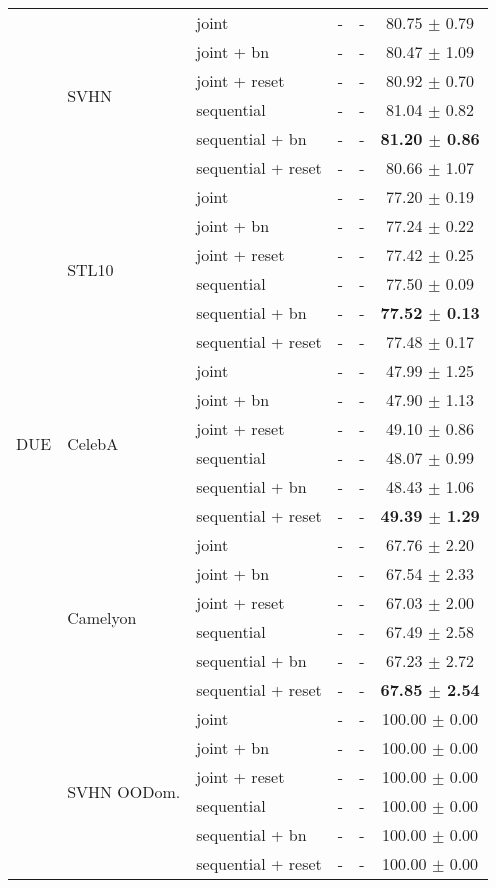 \begin{table}[!htb]
\begin{tabular}{lllccc}
\multirow{30}{*}{DUE} &\multirow{6}{*}{SVHN} &joint &- &- &80.75 $\pm$ 0.79 \\
& &joint + bn &- &- &80.47 $\pm$ 1.09 \\
& &joint + reset &- &- &80.92 $\pm$ 0.70 \\
& &sequential &- &- &81.04 $\pm$ 0.82 \\
& &sequential + bn &- &- &\textbf{81.20 $\pm$ 0.86} \\
& &sequential + reset &- &- &80.66 $\pm$ 1.07 \\
\cmidrule[0.1pt](lr){2-6}
&\multirow{6}{*}{STL10} &joint &- &- &77.20 $\pm$ 0.19 \\
& &joint + bn &- &- &77.24 $\pm$ 0.22 \\
& &joint + reset &- &- &77.42 $\pm$ 0.25 \\
& &sequential &- &- &77.50 $\pm$ 0.09 \\
& &sequential + bn &- &- &\textbf{77.52 $\pm$ 0.13} \\
& &sequential + reset &- &- &77.48 $\pm$ 0.17 \\
\cmidrule[0.1pt](lr){2-6}
&\multirow{6}{*}{CelebA} &joint &- &- &47.99 $\pm$ 1.25 \\
& &joint + bn &- &- &47.90 $\pm$ 1.13 \\
& &joint + reset &- &- &49.10 $\pm$ 0.86 \\
& &sequential &- &- &48.07 $\pm$ 0.99 \\
& &sequential + bn &- &- &48.43 $\pm$ 1.06 \\
& &sequential + reset &- &- &\textbf{49.39 $\pm$ 1.29} \\
\cmidrule[0.1pt](lr){2-6}
&\multirow{6}{*}{Camelyon} &joint &- &- &67.76 $\pm$ 2.20 \\
& &joint + bn &- &- &67.54 $\pm$ 2.33 \\
& &joint + reset &- &- &67.03 $\pm$ 2.00 \\
& &sequential &- &- &67.49 $\pm$ 2.58 \\
& &sequential + bn &- &- &67.23 $\pm$ 2.72 \\
& &sequential + reset &- &- &\textbf{67.85 $\pm$ 2.54} \\
\cmidrule[0.1pt](lr){2-6}
&\multirow{6}{*}{SVHN OODom.} &joint &- &- &100.00 $\pm$ 0.00 \\
& &joint + bn &- &- &100.00 $\pm$ 0.00 \\
& &joint + reset &- &- &100.00 $\pm$ 0.00 \\
& &sequential &- &- &100.00 $\pm$ 0.00 \\
& &sequential + bn &- &- &100.00 $\pm$ 0.00 \\
& &sequential + reset &- &- &100.00 $\pm$ 0.00 \\
\bottomrule
\end{tabular}
\end{table}
